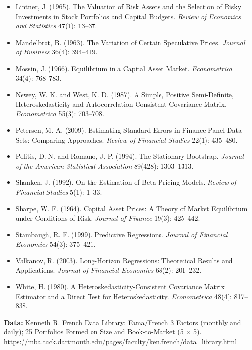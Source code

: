 \begin{itemize}
  \item Lintner, J. (1965). The Valuation of Risk Assets and the Selection of Risky Investments in Stock Portfolios and Capital Budgets. \emph{Review of Economics and Statistics} 47(1): 13--37.
  \item Mandelbrot, B. (1963). The Variation of Certain Speculative Prices. \emph{Journal of Business} 36(4): 394--419.
  \item Mossin, J. (1966). Equilibrium in a Capital Asset Market. \emph{Econometrica} 34(4): 768--783.
  \item Newey, W. K. and West, K. D. (1987). A Simple, Positive Semi-Definite, Heteroskedasticity and Autocorrelation Consistent Covariance Matrix. \emph{Econometrica} 55(3): 703--708.
  \item Petersen, M. A. (2009). Estimating Standard Errors in Finance Panel Data Sets: Comparing Approaches. \emph{Review of Financial Studies} 22(1): 435--480.
  \item Politis, D. N. and Romano, J. P. (1994). The Stationary Bootstrap. \emph{Journal of the American Statistical Association} 89(428): 1303--1313.
  \item Shanken, J. (1992). On the Estimation of Beta-Pricing Models. \emph{Review of Financial Studies} 5(1): 1--33.
  \item Sharpe, W. F. (1964). Capital Asset Prices: A Theory of Market Equilibrium under Conditions of Risk. \emph{Journal of Finance} 19(3): 425--442.
  \item Stambaugh, R. F. (1999). Predictive Regressions. \emph{Journal of Financial Economics} 54(3): 375--421.
  \item Valkanov, R. (2003). Long-Horizon Regressions: Theoretical Results and Applications. \emph{Journal of Financial Economics} 68(2): 201--232.
  \item White, H. (1980). A Heteroskedasticity-Consistent Covariance Matrix Estimator and a Direct Test for Heteroskedasticity. \emph{Econometrica} 48(4): 817--838.
\end{itemize}

\textbf{Data:} Kenneth R. French Data Library: Fama/French 3 Factors (monthly and daily); 25 Portfolios Formed on Size and Book-to-Market (5 $\times$ 5). \url{https://mba.tuck.dartmouth.edu/pages/faculty/ken.french/data_library.html}
